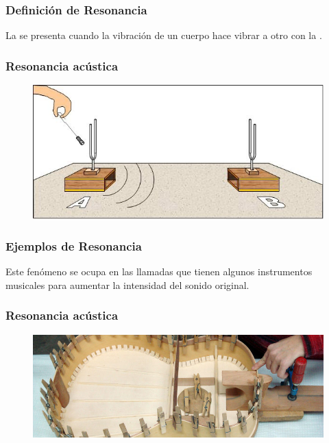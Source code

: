 \documentclass[14pt]{beamer}
\begin{document}
\begin{frame}
\frametitle{Definición de Resonancia}
La  se presenta cuando la vibración de un cuerpo hace vibrar a otro con la .
\end{frame}
\begin{frame}
\frametitle{Resonancia acústica}
\begin{figure}
    \centering
    \includegraphics[width=\linewidth]{Imagenes/Resonancia_01.jpg}
\end{figure}
\end{frame}
\begin{frame}
\frametitle{Ejemplos de Resonancia}
Este fenómeno se ocupa en las llamadas  que tienen algunos instrumentos musicales para aumentar la intensidad del sonido original.
\end{frame}
\begin{frame}
\frametitle{Resonancia acústica}
\begin{figure}
    \centering
    \includegraphics[width=\linewidth]{Imagenes/Resonancia_02.jpg}
\end{figure}
\end{frame}
\end{document}
